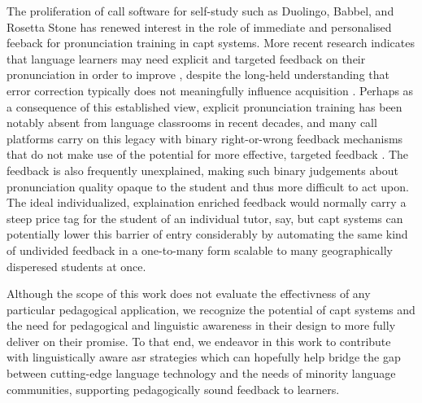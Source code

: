 \documentclass[thesis]{cluu}
\begin{document}
The proliferation of \gls{call} software for self-study such as Duolingo, Babbel, and Rosetta Stone has renewed interest in the role of immediate and personalised feeback for pronunciation training in \gls{capt} systems. More recent research indicates that language learners may need explicit and targeted feedback on their pronunciation in order to improve \parencite{bajorek2017l2}, despite the long-held understanding that error correction typically does not meaningfully influence acquisition \parencite{krashenPrinciplesPracticeSecond1984}. Perhaps as a consequence of this established view, explicit pronunciation training has been notably absent from language classrooms in recent decades, and many \gls{call} platforms carry on this legacy with binary right-or-wrong feedback mechanisms that do not make use of the potential for more effective, targeted feedback \parencite{bajorek2017l2}. The feedback is also frequently unexplained, making such binary judgements about pronunciation quality opaque to the student and thus more difficult to act upon. The ideal individualized, explaination enriched feedback would normally carry a steep price tag for the student of an individual tutor, say, but \gls{capt} systems can potentially lower this barrier of entry considerably by automating the same kind of undivided feedback in a one-to-many form scalable to many geographically disperesed students at once. 

Although the scope of this work does not evaluate the effectivness of any particular pedagogical application, we recognize the potential of \gls{capt} systems and the need for pedagogical and linguistic awareness in their design to more fully deliver on their promise. To that end, we endeavor in this work to contribute with linguistically aware \gls{asr} strategies which can hopefully help bridge the gap between cutting-edge language technology and the needs of minority language communities, supporting pedagogically sound feedback to learners.
\end{document}

